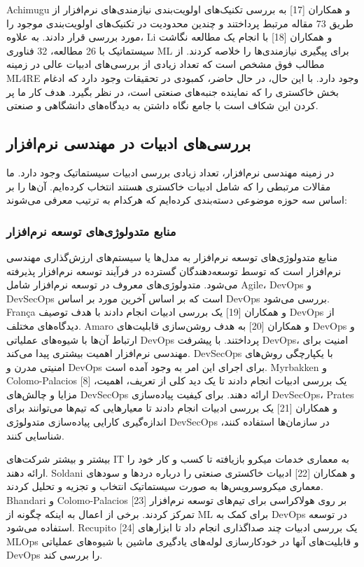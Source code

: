 \documentclass[a4paper,10pt]{article}
\begin{document}
                Achimugu و همکاران [17] به بررسی تکنیک‌های اولویت‌بندی نیازمندی‌های نرم‌افزار از طریق 73 مقاله مرتبط پرداختند و چندین محدودیت در تکنیک‌های اولویت‌بندی موجود را مورد بررسی قرار دادند. به علاوه، Li و همکاران [18] با انجام یک مطالعه نگاشت سیستماتیک با 26 مطالعه، 32 فناوری ML برای پیگیری نیازمندی‌ها را خلاصه کردند. از مطالب فوق مشخص است که تعداد زیادی از بررسی‌های ادبیات عالی در زمینه ML4RE وجود دارد. با این حال، در حال حاضر، کمبودی در تحقیقات وجود دارد که ادغام بخش خاکستری را که نماینده جنبه‌های صنعتی است، در نظر بگیرد. هدف کار ما پر کردن این شکاف است با جامع نگاه داشتن به دیدگاه‌های دانشگاهی و صنعتی.
        
        \subsection{بررسی‌های ادبیات در مهندسی نرم‌افزار}

            در زمینه مهندسی نرم‌افزار، تعداد زیادی بررسی ادبیات سیستماتیک وجود دارد. ما مقالات مرتبطی را که شامل ادبیات خاکستری هستند انتخاب کرده‌ایم. آن‌ها را بر اساس سه حوزه موضوعی دسته‌بندی کرده‌ایم که هرکدام به ترتیب معرفی می‌شوند:

            \subsubsection{منابع متدولوژی‌های توسعه نرم‌افزار}

                منابع متدولوژی‌های توسعه نرم‌افزار به مدل‌ها یا سیستم‌های ارزش‌گذاری مهندسی نرم‌افزار است که توسط توسعه‌دهندگان گسترده در فرآیند توسعه نرم‌افزار پذیرفته می‌شود. متدولوژی‌های معروف در توسعه نرم‌افزار شامل Agile، DevOps و DevSecOps است که بر اساس آخرین مورد بر اساس DevOps بررسی می‌شود. França و همکاران [19] یک بررسی ادبیات انجام دادند با هدف توصیف DevOps از دیدگاه‌های مختلف. Amaro و همکاران [20] به هدف روشن‌سازی قابلیت‌های DevOps و ارتباط آن‌ها با شیوه‌های عملیاتی DevOps پرداختند. با پیشرفت DevOps، امنیت برای مهندسی نرم‌افزار اهمیت بیشتری پیدا می‌کند. DevSecOps با یکپارچگی روش‌های امنیتی مدرن و DevOps برای اجرای این امر به وجود آمده است. Myrbakken و Colomo-Palacios [8] یک بررسی ادبیات انجام دادند تا یک دید کلی از تعریف، اهمیت، مزایا و چالش‌های DevSecOps ارائه دهند. برای کیفیت پیاده‌سازی DevSecOps، Prates و همکاران [21] یک بررسی ادبیات انجام دادند تا معیارهایی که تیم‌ها می‌توانند برای اندازه‌گیری کارایی پیاده‌سازی متدولوژی DevSecOps در سازمان‌ها استفاده کنند، شناسایی کنند. 

                بیشتر و بیشتر شرکت‌های IT به معماری خدمات میکرو بازیافته تا کسب و کار خود را ارائه دهند. Soldani و همکاران [22] ادبیات خاکستری صنعتی را درباره دردها و سودهای معماری میکروسرویس‌ها به صورت سیستماتیک انتخاب و تجزیه و تحلیل کردند. Bhandari و Colomo-Palacios [23] بر روی هولاکراسی برای تیم‌های توسعه نرم‌افزار تمرکز کردند. برخی از اعمال به اینکه چگونه از ML برای کمک به DevOps در توسعه استفاده می‌شود. Recupito [24] یک بررسی ادبیات چند صداگذاری انجام داد تا ابزارهای MLOps و قابلیت‌های آنها در خودکارسازی لوله‌های یادگیری ماشین با شیوه‌های عملیاتی DevOps را بررسی کند.
            
\end{document}
